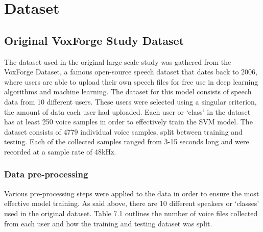 \documentclass[11pt,twoside,openany]{book}
\begin{document}
\section{Dataset}
\subsection{Original VoxForge Study Dataset}
The dataset used in the original large-scale study was gathered from the VoxForge Dataset, a famous open-source speech dataset that dates back to 2006, where users are able to upload their own speech files for free use in deep learning algorithms and machine learning. The dataset for this model consists of speech data from 10 different users. These users were selected using a singular criterion, the amount of data each user had uploaded. Each user or `class' in the dataset has at least 250 voice samples in order to effectively train the SVM model. The dataset consists of 4779 individual voice samples, split between training and testing. Each of the collected samples ranged from 3-15 seconds long and were recorded at a sample rate of 48kHz.

\subsubsection{Data pre-processing}
Various pre-processing steps were applied to the data in order to ensure the most effective model training. As said above, there are 10 different speakers or `classes' used in the original dataset. Table 7.1 outlines the number of voice files collected from each user and how the training and testing dataset was split.
\end{document}
